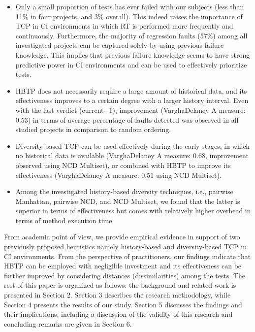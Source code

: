 \documentclass[1p]{elsarticle}
\begin{document}
\begin{itemize}
\item Only a small proportion of tests has ever failed with our subjects (less than 11\% in four projects, and 3\% overall). This indeed raises the importance of TCP in CI environments in which RT is performed more frequently and continuously. Furthermore, the majority of regression faults (57\%) among all investigated projects can be captured solely by using previous failure knowledge. This implies that previous failure knowledge seems to have strong predictive power in CI environments and can be used to effectively prioritize tests.

\item HBTP does not necessarily require a large amount of historical data, and its effectiveness improves to a certain degree with a larger history interval. Even with the last verdict (current$-1$), improvement (Vargha\textendash Delaney A measure: 0.53) in terms of average percentage of faults detected was observed in all studied projects in comparison to random ordering.

\item Diversity-based TCP can be used effectively during the early stages, in which no historical data is available (Vargha\textendash Delaney A measure: 0.68, improvement observed using NCD Multiset), or combined with HBTP to improve its effectiveness (Vargha\textendash Delaney A measure: 0.51 using NCD Multiset).

\item Among the investigated history-based diversity techniques, i.e., pairwise Manhattan, pairwise NCD, and NCD Multiset, we found that the latter is superior in terms of effectiveness but comes with relatively higher overhead in terms of method execution time. 
\end{itemize}


From academic point of view, we provide empirical evidence in support of two previously proposed heuristics namely history-based and diversity-based TCP in CI environments. From the perspective of practitioners, our findings indicate that HBTP can be employed with negligible investment and its effectiveness can be further improved by considering distances (dissimilarities) among the tests. The rest of this paper is organized as follows: the background and related work is presented in Section 2. Section 3 describes the research methodology, while Section 4 presents the results of our study. Section 5 discusses the findings and their implications, including a discussion of the validity of this research and concluding remarks are given in Section 6.
\end{document}
